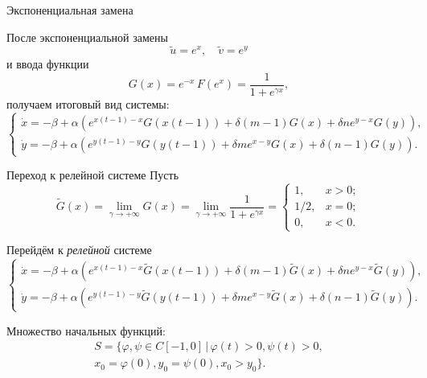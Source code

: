 \begin{frame}{Экспоненциальная замена}
	
	После экспоненциальной замены
	\begin{equation}
		\label{eq:exp_change}
		\tilde{u} = e^x, \quad \tilde{v} = e^y
	\end{equation}
	и ввода функции $$G(x) = e^{-x} \, F (e^x) = \dfrac{1}{1 + e^{\gamma x}},$$ получаем итоговый вид системы:
	\footnotesize
	\begin{equation*}
		\label{eq:system_main}
		\begin{cases}
			\dot{x} = -\beta + \alpha \left(e^{x(t - 1) - x} G(x(t - 1)) + \delta (m - 1) G(x) + \delta n e^{y - x} G(y)\right),\\
			\dot{y} = -\beta + \alpha \left(e^{y(t - 1) - y} G(y(t - 1)) + \delta m e^{x - y} G(x) + \delta (n - 1) G(y)\right).
		\end{cases}
	\end{equation*}
	\normalsize
\end{frame}

\begin{frame}{Переход к релейной системе}
	Пусть 
	\begin{equation*}
		\tilde{G}(x) = \lim\limits_{\gamma \to +\infty} G(x) = \lim\limits_{\gamma \to +\infty} \dfrac{1}{1 + e^{\gamma x}} = \begin{cases}
			1, & x > 0;\\
			1/2, & x = 0;\\
			0, & x < 0.
		\end{cases}
	\end{equation*}
	
	Перейдём к \emph{релейной} системе
	\footnotesize
	\begin{equation*}
		\label{eq:system_main}
		\begin{cases}
			\dot{x} = -\beta + \alpha \left(e^{x(t - 1) - x} \tilde{G}(x(t - 1)) + \delta (m - 1) \tilde{G}(x) + \delta n e^{y - x} \tilde{G}(y)\right),\\
			\dot{y} = -\beta + \alpha \left(e^{y(t - 1) - y} \tilde{G}(y(t - 1)) + \delta m e^{x - y} \tilde{G}(x) + \delta (n - 1) \tilde{G}(y)\right).
		\end{cases}
	\end{equation*}
	\normalsize
	
	\pause
	\bigskip
	
	Множество начальных функций:
	\begin{multline*}
		\label{eq:initial_set}
		S = \{\varphi, \psi \in C[-1, 0] \,|\, \varphi(t) > 0, \psi(t) > 0, \\ x_0 = \varphi(0), y_0 = \psi(0), x_0 > y_0 \}.
	\end{multline*}
\end{frame}


